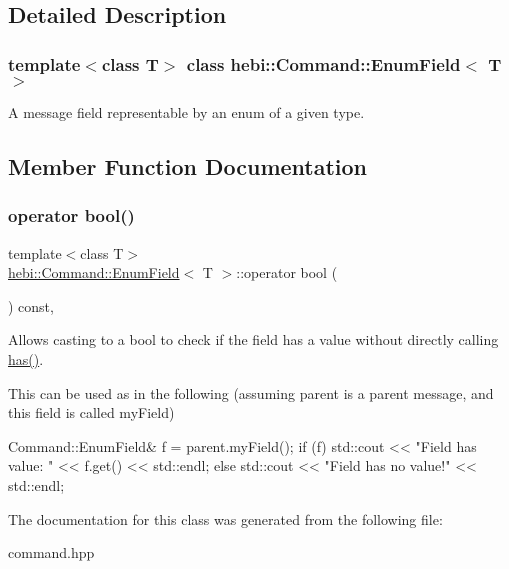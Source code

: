 \subsection{Detailed Description}
\subsubsection*{template$<$class T$>$\newline
class hebi\+::\+Command\+::\+Enum\+Field$<$ T $>$}

A message field representable by an enum of a given type. 

\subsection{Member Function Documentation}
\mbox{\label{classhebi_1_1Command_1_1EnumField_a31db0d8c93e30a521b636b8383c97314}} 
\subsubsection{\texorpdfstring{operator bool()}{operator bool()}}
{\footnotesize\ttfamily template$<$class T$>$ \\
\hyperlink{classhebi_1_1Command_1_1EnumField}{hebi\+::\+Command\+::\+Enum\+Field}$<$ T $>$\+::operator bool (\begin{DoxyParamCaption}{ }\end{DoxyParamCaption}) const\hspace{0.3cm}{\ttfamily [inline]}, {\ttfamily [explicit]}}



Allows casting to a bool to check if the field has a value without directly calling {\ttfamily \hyperlink{classhebi_1_1Command_1_1EnumField_a4323594bf8b1c8c621a027d869ea7281}{has()}}. 

This can be used as in the following (assuming \textquotesingle{}parent\textquotesingle{} is a parent message, and this field is called \textquotesingle{}my\+Field\textquotesingle{}) 
\begin{DoxyCode}
Command::EnumField& f = parent.myField();
\textcolor{keywordflow}{if} (f)
  std::cout << \textcolor{stringliteral}{"Field has value: "} << f.get() << std::endl;
\textcolor{keywordflow}{else}
  std::cout << \textcolor{stringliteral}{"Field has no value!"} << std::endl;
\end{DoxyCode}
 

The documentation for this class was generated from the following file\+:\begin{DoxyCompactItemize}
\item 
command.\+hpp\end{DoxyCompactItemize}
